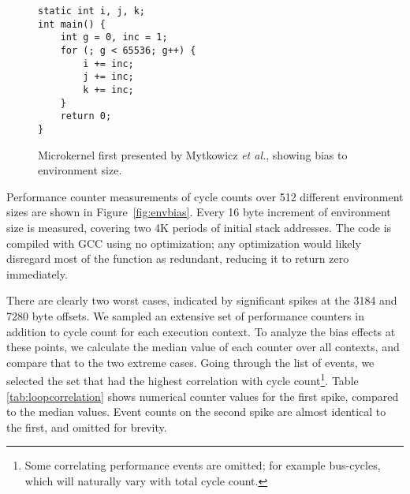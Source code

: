 \documentclass[10pt, conference, compsocconf]{IEEEtran}
\begin{document}
\begin{figure}[t]
  \begin{lstlisting}[frame=single, xleftmargin=.01\textwidth, xrightmargin=.01\textwidth]
static int i, j, k;
int main() {
    int g = 0, inc = 1;
    for (; g < 65536; g++) {
        i += inc;
        j += inc;
        k += inc;
    }
    return 0;
}
  \end{lstlisting}
  \caption{\label{fig:microkernel}Microkernel first presented by Mytkowicz \emph{et al.}\cite{Mytkowicz:2009:WrongData}, showing bias to environment size.}
\end{figure}

\begin{figure*}[t]
  \caption{Bias from environment size for microkernel. Measured average of 10 cycle count samples for 512 different environments. Spikes show aliasing case, occurring once for each 4K period.}
  \label{fig:envbias}
\end{figure*}

Performance counter measurements of cycle counts over 512 different environment sizes are shown in Figure~\ref{fig:envbias}.
Every 16 byte increment of environment size is measured, covering two 4K periods of initial stack addresses.
The code is compiled with {\small{GCC}} using no optimization; any optimization would likely disregard most of the function as redundant, reducing it to return zero immediately.

There are clearly two worst cases, indicated by significant spikes at the 3184 and 7280 byte offsets.
We sampled an extensive set of performance counters in addition to cycle count for each execution context.
To analyze the bias effects at these points, we calculate the median value of each counter over all contexts, and compare that to the two extreme cases.
Going through the list of events, we selected the set that had the highest correlation with cycle count\footnote{Some correlating performance events are omitted; for example bus-cycles, which will naturally vary with total cycle count.}.
Table \ref{tab:loopcorrelation} shows numerical counter values for the first spike, compared to the median values. Event counts on the second spike are almost identical to the first, and omitted for brevity.
\end{document}
